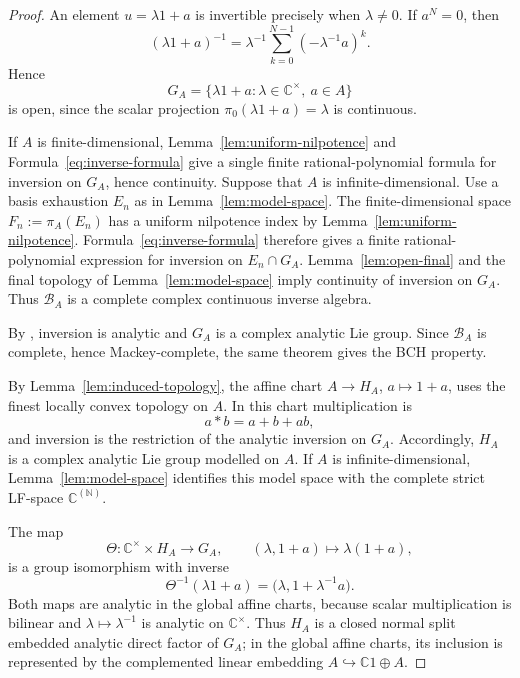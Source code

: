\documentclass[11pt]{article}
\theoremstyle{remark}
\begin{document}
\begin{proof}
An element $u=\lambda1+a$ is invertible precisely when $\lambda\neq0$.  If
$a^N=0$, then
\begin{equation}
  (\lambda1+a)^{-1}
  =\lambda^{-1}\sum_{k=0}^{N-1}(-\lambda^{-1}a)^k.
  \label{eq:inverse-formula}
\end{equation}
Hence
\[
  G_A=\{\lambda1+a:\lambda\in\mathbb C^\times,\ a\in A\}
\]
is open, since the scalar projection
$\pi_0(\lambda1+a)=\lambda$ is continuous.

If $A$ is finite-dimensional, Lemma~\ref{lem:uniform-nilpotence} and
Formula~\eqref{eq:inverse-formula} give a single finite rational-polynomial
formula for inversion on $G_A$, hence continuity.  Suppose that $A$ is
infinite-dimensional.  Use a basis exhaustion $E_n$ as in
Lemma~\ref{lem:model-space}.  The finite-dimensional space
$F_n:=\pi_A(E_n)$ has a uniform nilpotence index by
Lemma~\ref{lem:uniform-nilpotence}.  Formula~\eqref{eq:inverse-formula}
therefore gives a finite rational-polynomial expression for inversion on
$E_n\cap G_A$.  Lemma~\ref{lem:open-final} and the final topology of
Lemma~\ref{lem:model-space} imply continuity of inversion on $G_A$.  Thus
$\mathcal B_A$ is a complete complex continuous inverse algebra.

By \cite[Theorem~5.6]{GlocknerCIA2002}, inversion is analytic and $G_A$
is a complex analytic Lie group.  Since $\mathcal B_A$ is complete, hence
Mackey-complete, the same theorem gives the BCH property.

By Lemma~\ref{lem:induced-topology}, the affine chart
$A\to H_A$, $a\mapsto1+a$, uses the finest locally convex topology on $A$.
In this chart multiplication is
\[
  a*b=a+b+ab,
\]
and inversion is the restriction of the analytic inversion on $G_A$.
Accordingly, $H_A$ is a complex analytic Lie group modelled on $A$.  If $A$
is infinite-dimensional, Lemma~\ref{lem:model-space} identifies this model
space with the complete strict LF-space $\mathbb{C}^{(\mathbb{N})}$.

The map
\[
  \Theta:\mathbb C^\times\times H_A\to G_A,
  \qquad (\lambda,1+a)\mapsto\lambda(1+a),
\]
is a group isomorphism with inverse
\[
  \Theta^{-1}(\lambda1+a)
  =\bigl(\lambda,1+\lambda^{-1}a\bigr).
\]
Both maps are analytic in the global affine charts, because scalar
multiplication is bilinear and $\lambda\mapsto\lambda^{-1}$ is analytic on
$\mathbb C^\times$.  Thus $H_A$ is a closed normal split embedded analytic direct factor of $G_A$;
in the global affine charts, its inclusion is represented by the complemented
linear embedding $A\hookrightarrow\mathbb C1\oplus A$.


\end{proof}
\end{document}
